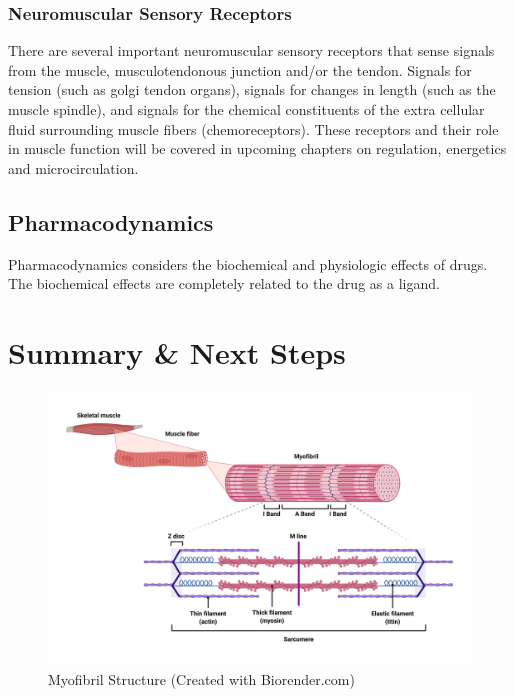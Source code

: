 \subsubsection{Neuromuscular Sensory Receptors} 
There are several important neuromuscular sensory receptors that sense signals from the muscle, musculotendonous junction and/or the tendon. Signals for tension (such as golgi tendon organs), signals for changes in length (such as the muscle spindle), and signals for the chemical constituents of the extra cellular fluid surrounding muscle fibers (chemoreceptors). These receptors and their role in muscle function will be covered in upcoming chapters on regulation, energetics and microcirculation.

\subsection{Pharmacodynamics}

Pharmacodynamics considers the biochemical and physiologic effects of drugs. The biochemical effects are completely related to the drug as a ligand. 

\section{Summary \& Next Steps}



\begin{figure}[!ht]
    \centering
    \includegraphics[width=1\linewidth]{./figure/Myofibril_Structure.png}
    \caption{Myofibril Structure \footnotesize{(Created with Biorender.com)}}
    \label{fig:Myofibril_Structure}
\end{figure}


